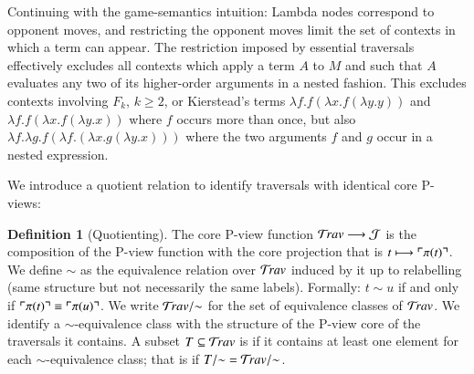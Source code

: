 \documentclass{elsarticle}
\makeatletter
\newif\iflongversion
\theoremstyle{plain}
\newtheorem{property}[theorem]{Property}
\theoremstyle{definition}
\newtheorem{definition}{Definition}[section]
\theoremstyle{remark}
\newcommand\Nodes{\mathcal{N}}%
\newcommand\NodesLmd{\Nodes_\lambda}%
\newcommand{\travulc}{\travset}
\def\coresymbol{\pi} %
\newcommand{\core}[1]{\coresymbol(#1)} %
\newcommand{\ExternalNodes}{\Nodes^{\sf ext}}
\renewcommand\ie{{\it i.e.\@\xspace}}
\def\justseqset{\mathcal{J}}
\makeatother
\begin{document}
Continuing with the game-semantics intuition: Lambda nodes correspond to opponent moves, and restricting the opponent moves limit the set of contexts in which a term can appear. The restriction imposed by essential traversals effectively excludes all contexts which apply a term $A$ to $M$ and such that $A$ evaluates any two of its higher-order arguments in a nested fashion. This excludes contexts involving $F_k$, $k\geq 2$, or Kierstead's terms $\lambda f .f (\lambda x .f (\lambda y.y))$ and $\lambda f .f (\lambda x .f (\lambda y.x))$ where $f$ occurs more than once, but also $\lambda f. \lambda g . f (\lambda f .(\lambda x . g (\lambda y . x)))$ where the two arguments $f$ and $g$ occur in a nested expression.

\iflongversion
\begin{property}
\label{prop:core_truncation_at_externallambda}
Let $t\in\travulc$ be a traversal which does not contain any ghost occurrence, and $m$ be an occurrence in $t$ of an external $\lambda$-node (\ie, $m \in \NodesLmd\inter\ExternalNodes$). Then $\core{t_{<m}} = \core{t}_{<m}$.
\end{property}
\begin{proof}
By an easy induction on $t$ using the fact that in the recursive calculation of $\coresymbol(t)$, external lambda nodes reset the stack of pending lambdas.
\end{proof}
\fi

We introduce a quotient relation to identify traversals with identical core P-views:
\begin{definition}[Quotienting]
The core P-view function
$\travulc \longrightarrow \justseqset $
is the composition of
the P-view function
 with the core projection
 that is $t \longmapsto \pview{\core{t}}$.
We define $\sim$ as the equivalence relation over $\travulc$ induced by it up to relabelling (same structure but not necessarily the same labels). Formally: $t \sim u$ if and only if $\pview{\core{t}} \equiv \pview{\core{u}}$.
We write $\travulc/{\sim}$ for the set of equivalence classes of $\travulc$.
We identify a $\sim$-equivalence class with the structure of the P-view core of the traversals it contains.
A subset $T\subseteq \travulc$ is  if it contains at least one element for each $\sim$-equivalence class; that is if $T/{\sim} = \travulc/{\sim}$.
\end{definition}
\end{document}
